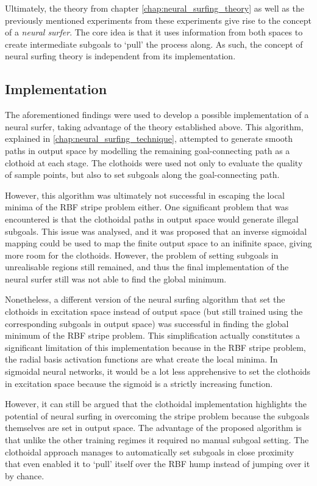 Ultimately, the theory from chapter \ref{chap:neural_surfing_theory} as well as the previously mentioned experiments from these experiments give rise to the concept of a \textit{neural surfer}.
The core idea is that it uses information from both spaces to create intermediate subgoals to `pull' the process along.
As such, the concept of neural surfing theory is independent from its implementation.

\subsection{Implementation}
The aforementioned findings were used to develop a possible implementation of a neural surfer, taking advantage of the theory established above.
This algorithm, explained in \ref{chap:neural_surfing_technique}, attempted to generate smooth paths in output space by modelling the remaining goal-connecting path as a clothoid at each stage.
The clothoids were used not only to evaluate the quality of sample points, but also to set subgoals along the goal-connecting path.

However, this algorithm was ultimately not successful in escaping the local minima of the RBF stripe problem either.
One significant problem that was encountered is that the clothoidal paths in output space would generate illegal subgoals.
This issue was analysed, and it was proposed that an inverse sigmoidal mapping could be used to map the finite output space to an inifinite space, giving more room for the clothoids.
However, the problem of setting subgoals in unrealisable regions still remained, and thus the final implementation of the neural surfer still was not able to find the global minimum.

Nonetheless, a different version of the neural surfing algorithm that set the clothoids in excitation space instead of output space (but still trained using the corresponding subgoals in output space) was successful in finding the global minimum of the RBF stripe problem.
This simplification actually constitutes a significant limitation of this implementation because in the RBF stripe problem, the radial basis activation functions are what create the local minima.
In sigmoidal neural networks, it would be a lot less apprehensive to set the clothoids in excitation space because the sigmoid is a strictly increasing function.

However, it can still be argued that the clothoidal implementation highlights the potential of neural surfing in overcoming the stripe problem because the subgoals themselves are set in output space.
The advantage of the proposed algorithm is that unlike the other training regimes it required no manual subgoal setting.
The clothoidal approach manages to automatically set subgoals in close proximity that even enabled it to `pull' itself over the RBF hump instead of jumping over it by chance.

